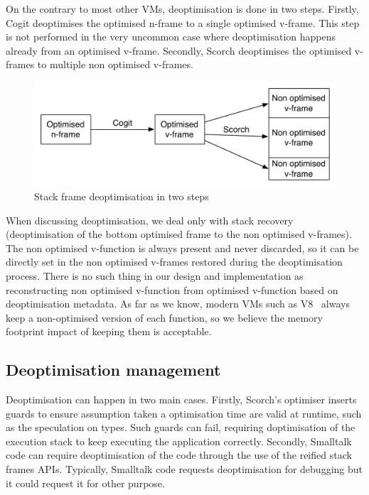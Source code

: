 \documentclass[a4paper,12pt,twoside]{../includes/ThesisStyle}
\begin{document}
On the contrary to most other VMs, deoptimisation is done in two steps. Firstly, Cogit deoptimises the optimised n-frame to a single optimised v-frame. This step is not performed in the very uncommon case where deoptimisation happens already from an optimised v-frame. Secondly, Scorch deoptimises the optimised v-frames to multiple non optimised v-frames.

\begin{figure}[h!]
    \begin{center}
        \includegraphics[width=0.9\linewidth]{SFDeoptimisation}
        \caption{Stack frame deoptimisation in two steps}
        \label{fig:SFDeoptimisation}
    \end{center}
\end{figure}

When discussing deoptimisation, we deal only with stack recovery (deoptimisation of the bottom optimised frame to the non optimised v-frames). The non optimised v-function is always present and never discarded, so it can be directly set in the non optimised v-frames restored during the deoptimisation process. There is no such thing in our design and implementation as reconstructing non optimised v-function from optimised v-function based on deoptimisation metadata. As far as we know, modern VMs such as V8~\cite{V8} always keep a non-optimised version of each function, so we believe the memory footprint impact of keeping them is acceptable.

\subsection{Deoptimisation management}

Deoptimisation can happen in two main cases. Firstly, Scorch's optimiser inserts guards to ensure assumption taken a optimisation time are valid at runtime, such as the speculation on types. Such guards can fail, requiring doptimisation of the execution stack to keep executing the application correctly. Secondly, Smalltalk code can require deoptimisation of the code through the use of the reified stack frames APIs. Typically, Smalltalk code requests deoptimisation for debugging but it could request it for other purpose.
\end{document}
